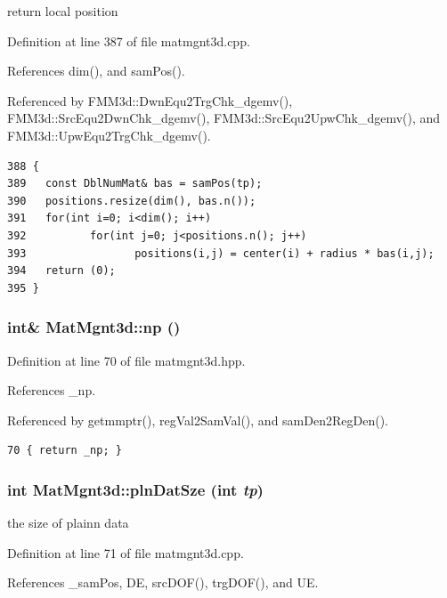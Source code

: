 return local position 

Definition at line 387 of file matmgnt3d.cpp.

References dim(), and sam\-Pos().

Referenced by FMM3d::Dwn\-Equ2Trg\-Chk\_\-dgemv(), FMM3d::Src\-Equ2Dwn\-Chk\_\-dgemv(), FMM3d::Src\-Equ2Upw\-Chk\_\-dgemv(), and FMM3d::Upw\-Equ2Trg\-Chk\_\-dgemv().

\footnotesize\begin{verbatim}388 {
389   const DblNumMat& bas = samPos(tp);
390   positions.resize(dim(), bas.n());
391   for(int i=0; i<dim(); i++)
392          for(int j=0; j<positions.n(); j++)
393                 positions(i,j) = center(i) + radius * bas(i,j);
394   return (0);
395 }
\end{verbatim}\normalsize 


\subsubsection{\setlength{\rightskip}{0pt plus 5cm}int\& Mat\-Mgnt3d::np ()\hspace{0.3cm}{\tt  [inline]}}\label{classMatMgnt3d_79545716c1fbc95cbd811a65ffa9f767_79545716c1fbc95cbd811a65ffa9f767}




Definition at line 70 of file matmgnt3d.hpp.

References \_\-np.

Referenced by getmmptr(), reg\-Val2Sam\-Val(), and sam\-Den2Reg\-Den().

\footnotesize\begin{verbatim}70 { return _np; }
\end{verbatim}\normalsize 


\subsubsection{\setlength{\rightskip}{0pt plus 5cm}int Mat\-Mgnt3d::pln\-Dat\-Sze (int {\em tp})}\label{classMatMgnt3d_7b6cc287face26f0d82bc4676e69fb83_7b6cc287face26f0d82bc4676e69fb83}


the size of plainn data 

Definition at line 71 of file matmgnt3d.cpp.

References \_\-sam\-Pos, DE, src\-DOF(), trg\-DOF(), and UE.

